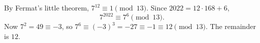 By Fermat's little theorem, $7^{12}\equiv1\pmod{13}$. Since $2022=12\cdot168+6$,
\[7^{2022}\equiv7^6\pmod{13}.\]
Now $7^2=49\equiv-3$, so $7^6\equiv(-3)^3=-27\equiv-1\equiv12\pmod{13}$. The remainder is $\boxed{12}$.
